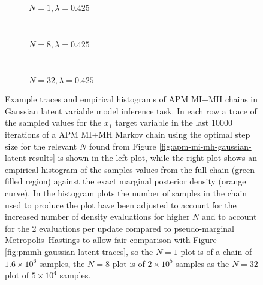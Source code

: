 \begin{figure}[t]
\centering
\begin{subfigure}[b]{\linewidth}
\centering
  \vspace{-5mm}
  \caption{$N=1, \lambda=0.425$}
  \label{sfig:apm-mi-mh-1-gaussian-latent-trace}
\end{subfigure}
\\[3mm]
\begin{subfigure}[b]{\linewidth}
\centering
  \vspace{-5mm}
  \caption{$N=8, \lambda=0.425$}
  \label{sfig:apm-mi-mh-8-gaussian-latent-trace}
\end{subfigure}
\\[3mm]
\begin{subfigure}[b]{\linewidth}
\centering
  \vspace{-5mm}
  \caption{$N=32, \lambda=0.425$}
  \label{sfig:apm-mi-mh-32-gaussian-latent-trace}
\end{subfigure}
\caption[\acs{APM} \acs{MI}+\acs{MH} Gaussian model traces.]{
Example traces and empirical histograms of \ac{APM} \ac{MI}+\ac{MH} chains in Gaussian latent variable model inference task. In each row a trace of the sampled values for the $x_1$ target variable in the last 10000 iterations of a \ac{APM} \ac{MI}+\ac{MH} Markov chain using the optimal step size for the relevant $N$ found from Figure \ref{fig:apm-mi-mh-gaussian-latent-results} is shown in the left plot, while the right plot shows an empirical histogram of the samples values from the full chain (green filled region) against the exact marginal posterior density (orange curve). In the histogram plots the number of samples in the chain used to produce the plot have been adjusted to account for the increased number of density evaluations for higher $N$ and to account for the 2 evaluations per update compared to pseudo-marginal Metropolis--Hastings to allow fair comparison with Figure \ref{fig:pmmh-gaussian-latent-traces}, so the $N=1$ plot is of a chain of $1.6\times 10^6$ samples, the $N=8$ plot is of $2\times 10^5$ samples as the $N=32$ plot of $5 \times 10^4$ samples.}
\label{fig:apm-mi-mh-gaussian-latent-traces}
\end{figure}

